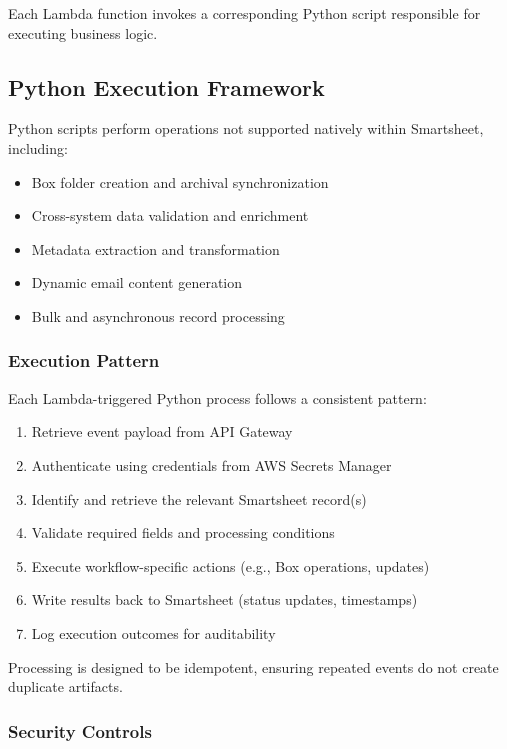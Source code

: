 \documentclass[12pt]{article}
\begin{document}
Each Lambda function invokes a corresponding Python script responsible for executing business logic.

\subsection{Python Execution Framework}

Python scripts perform operations not supported natively within Smartsheet, including:

\begin{itemize}
    \item Box folder creation and archival synchronization
    \item Cross-system data validation and enrichment
    \item Metadata extraction and transformation
    \item Dynamic email content generation
    \item Bulk and asynchronous record processing
\end{itemize}

\subsubsection{Execution Pattern}

Each Lambda-triggered Python process follows a consistent pattern:

\begin{enumerate}
    \item Retrieve event payload from API Gateway
    \item Authenticate using credentials from AWS Secrets Manager
    \item Identify and retrieve the relevant Smartsheet record(s)
    \item Validate required fields and processing conditions
    \item Execute workflow-specific actions (e.g., Box operations, updates)
    \item Write results back to Smartsheet (status updates, timestamps)
    \item Log execution outcomes for auditability
\end{enumerate}

Processing is designed to be idempotent, ensuring repeated events do not create duplicate artifacts.

\subsubsection{Security Controls}
\end{document}
